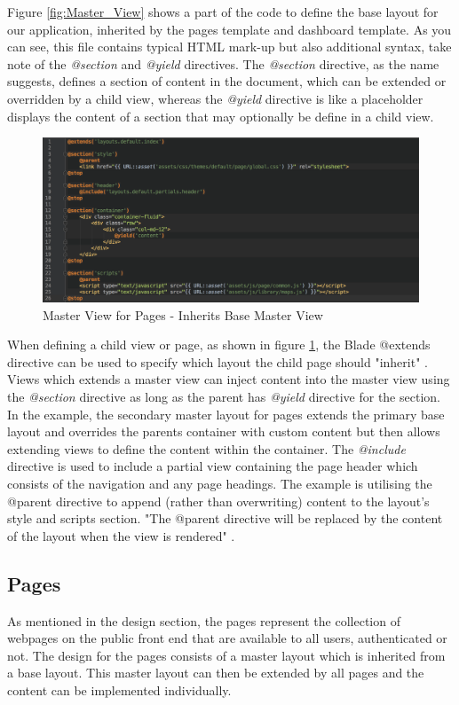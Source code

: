 Figure \ref{fig:Master_View} shows a part of the code to define the base layout for our application, inherited by the pages template and dashboard template. As you can see, this file contains typical HTML mark-up but also additional syntax, take note of the \emph{@section} and \emph{@yield} directives. The \emph{@section} directive, as the name suggests, defines a section of content in the document, which can be extended or overridden by a child view, whereas the \emph{@yield} directive is like a placeholder displays the content of a section that may optionally be define in a child view.

\begin{figure}[H]
	\centering
	\includegraphics[width=1.0\textwidth]{images/Code/Master_Page}
	\caption{Master View for Pages - Inherits Base Master View} \label{fig:Master_Page}
\end{figure}

When defining a child view or page, as shown in figure \ref{fig:Master_Page}, the Blade @extends directive can be used to specify which layout the child page should "inherit" \cite{Laravel:Blade}. Views which extends a master view can inject content into the master view using the \emph{@section} directive as long as the parent has \emph{@yield} directive for the section. In the example, the secondary master layout for pages extends the primary base layout and overrides the parents container with custom content but then allows extending views to define the content within the container. The \emph{@include} directive is used to include a partial view containing the page header which consists of the navigation and any page headings. The example is utilising the @parent directive to append (rather than overwriting) content to the layout's style and scripts section. "The @parent directive will be replaced by the content of the layout when the view is rendered" \cite{Laravel:Blade}.

\subsection{Pages}
As mentioned in the design section, the pages represent the collection of webpages on the public front end that are available to all users, authenticated or not. The design for the pages consists of a master layout which is inherited from a base layout. This master layout can then be extended by all pages and the content can be implemented individually.

